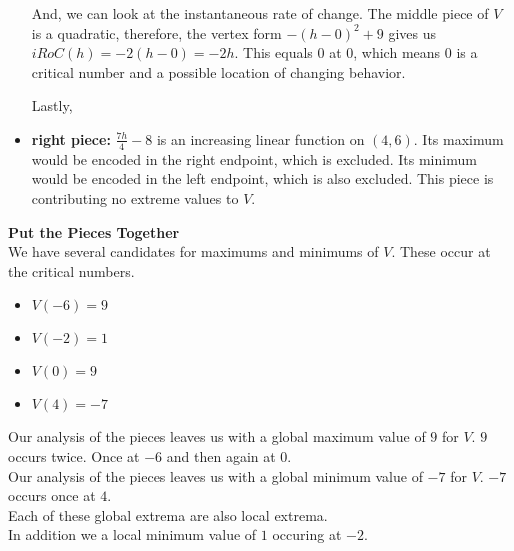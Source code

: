 \documentclass{ximera}
\begin{document}
\begin{itemize}
\begin{observation}
And, we can look at the instantaneous rate of change. The middle piece of $V$ is a quadratic, therefore, the vertex form $-(h-0)^2 + 9$ gives us $iRoC(h) = -2(h-0) = -2h$.  This equals $0$ at $0$, which means $0$ is a critical number and a possible location of changing behavior.

\end{observation}
Lastly, \\


  \item \textbf{right piece:}  \textbf{$\frac{7h}{4} - 8$} is an increasing linear function on $(4, 6)$.  Its maximum would be encoded in the right endpoint, which is excluded. Its minimum would be encoded in the left endpoint, which is also excluded. This piece is contributing no extreme values to $V$.
\end{itemize}








\textbf{\textcolor{blue!55!black}{Put the Pieces Together}} \\ 


We have several candidates for maximums and minimums of $V$. These occur at the critical numbers.\\


\begin{itemize}
  \item $V(-6) = 9$
  \item $V(-2) = 1$
  \item $V(0) = 9$
  \item $V(4) = -7$
\end{itemize}




Our analysis of the pieces leaves us with a global maximum value of $9$ for $V$.  $9$ occurs twice.  Once at $-6$ and then again at $0$. \\

Our analysis of the pieces leaves us with a global minimum value of $-7$ for $V$. $-7$ occurs once at $4$. \\



Each of these global extrema are also local extrema.  \\



In addition we a local minimum value of $1$ occuring at $-2$.  
\end{document}
